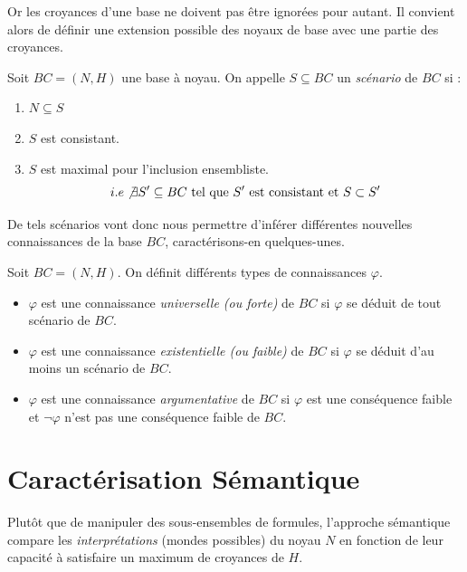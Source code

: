Or les croyances d'une base ne doivent pas être ignorées pour autant. 
Il convient alors de définir une extension possible des noyaux de base avec une partie
des croyances. 

\begin{definition}[Scenario]
    Soit $BC = (N, H)$ une base à noyau. On appelle $S \subseteq BC$ un \emph{scénario} de $BC$ si : 
    \begin{enumerate}[label=\roman*)]
        \item $ N \subseteq S$
        \item $S$ est consistant. 
        \item $S$ est maximal pour l'inclusion ensembliste. 
            $$ i.e \not \exists S' \subseteq BC \text{ tel que } S' \text{ est consistant et } S \subset S' $$ 
    \end{enumerate}
\end{definition}

De tels scénarios vont donc nous permettre d'inférer différentes nouvelles connaissances de 
la base $BC$, caractérisons-en quelques-unes. 

\begin{definition}[Conséquences]
    Soit $BC = (N, H)$. On définit différents types de connaissances $ \varphi$. 
    \begin{itemize}
        \item $ \varphi$ est une connaissance \emph{universelle (ou forte)} de $BC$ si $ \varphi$ 
        se déduit de tout scénario de $BC$. 
        \item $ \varphi$ est une connaissance \emph{existentielle (ou faible)} de $BC$ si $ \varphi$ 
        se déduit d'au moins un scénario de $BC$. 
        \item $ \varphi$ est une connaissance \emph{argumentative} de $BC$ si $ \varphi$ 
        est une conséquence faible et $ \lnot \varphi$ n'est pas une conséquence faible de $ BC$. 
    \end{itemize}
\end{definition}



\section{Caractérisation Sémantique}

Plutôt que de manipuler des sous-ensembles de formules, l'approche sémantique compare les \emph{interprétations} 
(mondes possibles) du noyau $N$ en fonction de leur capacité à satisfaire un maximum de croyances de $H$.

